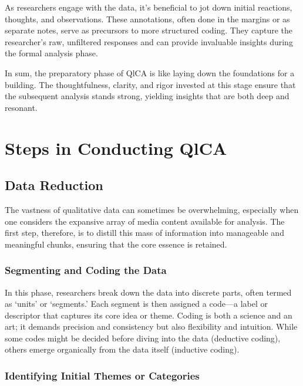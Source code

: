 \documentclass[
  b5paper]{book}
\begin{document}
As researchers engage with the data, it's beneficial to jot down initial reactions, thoughts, and observations. These annotations, often done in the margins or as separate notes, serve as precursors to more structured coding. They capture the researcher's raw, unfiltered responses and can provide invaluable insights during the formal analysis phase.

In sum, the preparatory phase of QlCA is like laying down the foundations for a building. The thoughtfulness, clarity, and rigor invested at this stage ensure that the subsequent analysis stands strong, yielding insights that are both deep and resonant.

\hypertarget{steps-in-conducting-qlca}{%
\section{Steps in Conducting QlCA}\label{steps-in-conducting-qlca}}

\hypertarget{data-reduction}{%
\subsection*{Data Reduction}\label{data-reduction}}

The vastness of qualitative data can sometimes be overwhelming, especially when one considers the expansive array of media content available for analysis. The first step, therefore, is to distill this mass of information into manageable and meaningful chunks, ensuring that the core essence is retained.

\hypertarget{segmenting-and-coding-the-data}{%
\subsubsection*{Segmenting and Coding the Data}\label{segmenting-and-coding-the-data}}

In this phase, researchers break down the data into discrete parts, often termed as `units' or `segments.' Each segment is then assigned a code---a label or descriptor that captures its core idea or theme. Coding is both a science and an art; it demands precision and consistency but also flexibility and intuition. While some codes might be decided before diving into the data (deductive coding), others emerge organically from the data itself (inductive coding).

\hypertarget{identifying-initial-themes-or-categories}{%
\subsubsection*{Identifying Initial Themes or Categories}\label{identifying-initial-themes-or-categories}}
\end{document}
